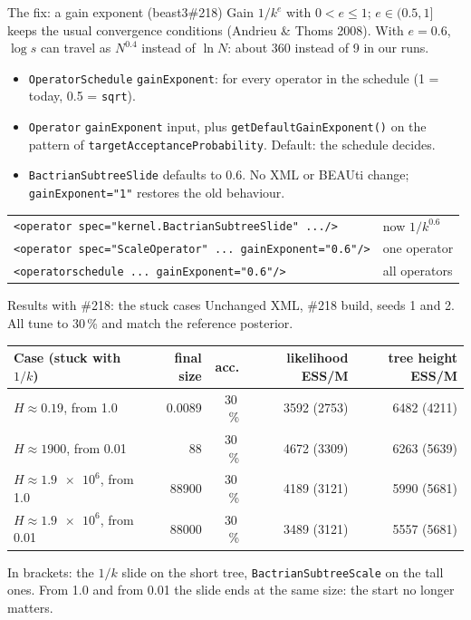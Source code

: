 \documentclass[aspectratio=169,11pt]{beamer}
\begin{document}
\begin{frame}[fragile]{The fix: a gain exponent (beast3\#218)}
  Gain $1/k^{e}$ with $0 < e \le 1$; $e \in (0.5, 1]$ keeps the usual convergence conditions
  (Andrieu \& Thoms 2008). With $e = 0.6$, $\log s$ can travel as $N^{0.4}$ instead of $\ln N$:
  about 360 instead of 9 in our runs.
  \begin{itemize}
    \item \texttt{OperatorSchedule} \texttt{gainExponent}: for every operator in the schedule
      (1 = today, 0.5 = \texttt{sqrt}).
    \item \texttt{Operator} \texttt{gainExponent} input, plus \texttt{getDefaultGainExponent()}
      on the pattern of \texttt{targetAcceptanceProbability}. Default: the schedule decides.
    \item \texttt{BactrianSubtreeSlide} defaults to \alert{0.6}. No XML or BEAUti change;
      \texttt{gainExponent="1"} restores the old behaviour.
  \end{itemize}
  \vspace{-0.4em}
  {\footnotesize
  \begin{tabular}{@{}ll@{}}
    \texttt{<operator spec="kernel.BactrianSubtreeSlide" .../>} & now $1/k^{0.6}$ \\
    \texttt{<operator spec="ScaleOperator" ... gainExponent="0.6"/>} & one operator \\
    \texttt{<operatorschedule ... gainExponent="0.6"/>} & all operators \\
  \end{tabular}}
\end{frame}

\begin{frame}{Results with \#218: the stuck cases}
  Unchanged XML, \#218 build, seeds 1 and 2. All tune to 30\,\% and match the reference posterior.

  \vspace{0.5em}
  \centering\small
  \begin{tabular}{lrrrr}
    \toprule
    Case (stuck with $1/k$) & final size & acc. & likelihood ESS/M & tree height ESS/M \\
    \midrule
    $H \approx 0.19$, from 1.0 & 0.0089 & 30\,\% & 3592 \;(2753) & 6482 \;(4211) \\
    $H \approx 1900$, from 0.01 & 88 & 30\,\% & 4672 \;(3309) & 6263 \;(5639) \\
    $H \approx \num{1.9e6}$, from 1.0 & \num{88900} & 30\,\% & 4189 \;(3121) & 5990 \;(5681) \\
    $H \approx \num{1.9e6}$, from 0.01 & \num{88000} & 30\,\% & 3489 \;(3121) & 5557 \;(5681) \\
    \bottomrule
  \end{tabular}

  \vspace{0.5em}
  \raggedright\footnotesize\color{ink2}
  In brackets: the $1/k$ slide on the short tree, \texttt{BactrianSubtreeScale} on the tall ones.
  From 1.0 and from 0.01 the slide ends at the same size: the start no longer matters.
\end{frame}
\end{document}
